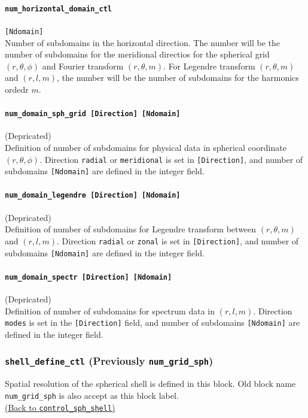 \paragraph{\tt num\_horizontal\_domain\_ctl}
\label{href_t:num_horizontal_domain_ctl} 
\verb|[Ndomain]| \\
Number of subdomains in the horizontal direction. The number will be the number of subdomains for the meridional directios for the spherical grid $(r, \theta, \phi)$ and Fourier transform $(r, \theta, m)$. For Legendre transform $(r, \theta, m)$ and $(r, l, m)$, the number will be the number of subdomains for the harmonics ordedr $m$.


\paragraph{\color{magenta} \tt num\_domain\_sph\_grid    [Direction]    [Ndomain]}
\label{href_t:num_domain_sph_grid} 
{\color{magenta} (Depricated)}\\
 Definition of number of subdomains for physical data in spherical coordinate $(r, \theta, \phi)$. Direction {\tt  radial} or {\tt meridional} is set in \verb|[Direction]|, and number of subdomains \verb|[Ndomain]| are defined in the integer field.

\paragraph{\color{magenta} \tt num\_domain\_legendre    [Direction]    [Ndomain]}
\label{href_t:num_domain_legendre}
{\color{magenta} (Depricated)}\\
 Definition of number of subdomains for Legendre transform between $(r, \theta, m)$ and $(r, l, m)$. Direction {\tt  radial} or {\tt zonal} is set in \verb|[Direction]|, and number of subdomains \verb|[Ndomain]| are defined in the integer field.

\paragraph{\color{magenta} \tt num\_domain\_spectr    [Direction]    [Ndomain]}
\label{href_t:num_domain_spectr}
{\color{magenta} (Depricated)}\\
Definition of number of subdomains for spectrum data in $(r, l, m)$. Direction {\tt  modes} is set in the \verb|[Direction]| field, and number of subdomains \verb|[Ndomain]| are defined in the integer field.


\subsubsection{{\tt shell\_define\_ctl} (Previously {\tt num\_grid\_sph})}
\label{href_t:num_grid_sph}
Spatial resolution of the spherical shell is defined in this block. Old block name \verb|num_grid_sph| is also accept as this block label.\\
\hyperref[href_i:num_grid_sph]{(Back to {\tt control\_sph\_shell})}

